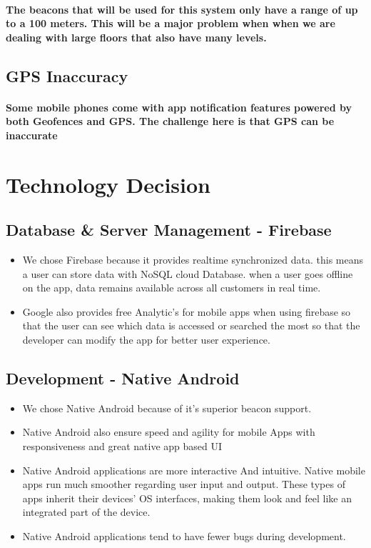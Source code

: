 \documentclass{article}
\begin{document}
\paragraph{The beacons that will be used for this system only have a range of up to a 100 meters. This will be a major problem when when we are dealing with large floors that also have many levels.}

\subsection{GPS Inaccuracy}
\paragraph{Some mobile phones come with app notification features powered by both Geofences and GPS. The challenge here is that GPS can be inaccurate}


\section{Technology Decision}
\subsection{Database & Server Management - Firebase}
\begin{itemize}
    \item We chose Firebase because it provides realtime synchronized data. this means a user can store data with NoSQL cloud Database. when a user goes offline on the app, data remains available across all customers in real time.
    \item Google also provides free Analytic's for mobile apps when using firebase so that the user can see which data is accessed or searched the most so that the developer can modify the app for better user experience.
\end{itemize}

\subsection{Development - Native Android}
\begin{itemize}
    \item We chose Native Android because of it's superior beacon support.
    \item Native Android also ensure speed and agility for mobile Apps with responsiveness and great native app based UI
    \item Native Android applications are more interactive And intuitive. Native mobile apps run much smoother regarding user input and output. These types of apps inherit their devices’ OS interfaces, making them look and feel like an integrated part of the device.
    \item Native Android applications tend to have fewer bugs during development.
\end{itemize}
\end{document}
